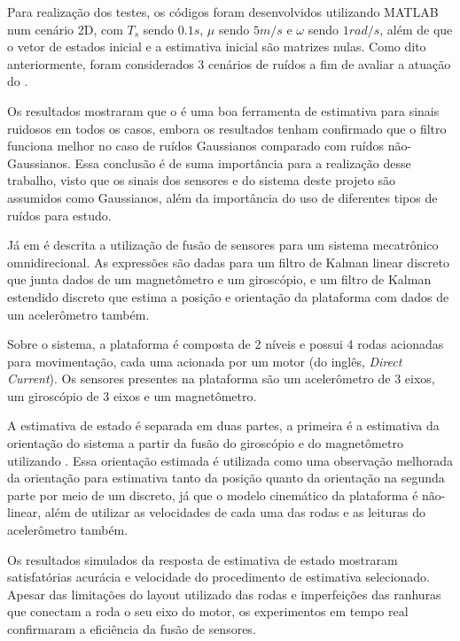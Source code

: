 \documentclass[acronym, symbols, table]{fei}
\begin{document}
Para realização dos testes, os códigos foram desenvolvidos utilizando MATLAB num cenário 2D, com $T_s$ sendo $0.1s$, $\mu$ sendo $5m/s$ e $\omega$ sendo $1rad/s$, além de que o vetor de estados inicial e a estimativa inicial são matrizes nulas. Como dito anteriormente, foram considerados 3 cenários de ruídos a fim de avaliar a atuação do .

Os resultados mostraram que o  é uma boa ferramenta de estimativa para sinais ruidosos em todos os casos, embora os resultados tenham confirmado que o filtro funciona melhor no caso de ruídos Gaussianos comparado com ruídos não-Gaussianos. Essa conclusão é de suma importância para a realização desse trabalho, visto que os sinais dos sensores e do sistema deste projeto são assumidos como Gaussianos, além da importância do uso de diferentes tipos de ruídos para estudo.

Já em \textcite{korotaj2021kalman} é descrita a utilização de fusão de sensores para um sistema mecatrônico omnidirecional. As expressões são dadas para um filtro de Kalman linear discreto que junta dados de um magnetômetro e um giroscópio, e um filtro de Kalman estendido discreto que estima a posição e orientação da plataforma com dados de um acelerômetro também.

Sobre o sistema, a plataforma é composta de 2 níveis e possui 4 rodas acionadas para movimentação, cada uma acionada por um motor  (do inglês, \textit{Direct Current}). Os sensores presentes na plataforma são um acelerômetro de 3 eixos, um giroscópio de 3 eixos e um magnetômetro.

A estimativa de estado é separada em duas partes, a primeira é a estimativa da orientação do sistema a partir da fusão do giroscópio e do magnetômetro utilizando . Essa orientação estimada é utilizada como uma observação melhorada da orientação para estimativa tanto da posição quanto da orientação na segunda parte por meio de um  discreto, já que o modelo cinemático da plataforma é não-linear, além de utilizar as velocidades de cada uma das rodas e as leituras do acelerômetro também.

Os resultados simulados da resposta de estimativa de estado mostraram satisfatórias acurácia e velocidade do procedimento de estimativa selecionado. Apesar das limitações do layout utilizado das rodas e imperfeições das ranhuras que conectam a roda o seu eixo do motor, os experimentos em tempo real confirmaram a eficiência da fusão de sensores.
\end{document}
